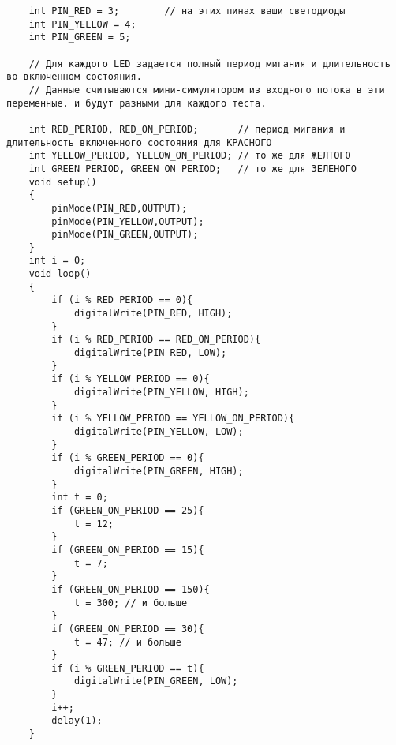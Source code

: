\codeExample

\begin{verbatim}
    int PIN_RED = 3;        // на этих пинах ваши светодиоды
    int PIN_YELLOW = 4;
    int PIN_GREEN = 5;

    // Для каждого LED задается полный период мигания и длительность во включенном состояния.
    // Данные считываются мини-симулятором из входного потока в эти переменные. и будут разными для каждого теста.

    int RED_PERIOD, RED_ON_PERIOD;       // период мигания и длительность включенного состояния для КРАСНОГО
    int YELLOW_PERIOD, YELLOW_ON_PERIOD; // то же для ЖЕЛТОГО
    int GREEN_PERIOD, GREEN_ON_PERIOD;   // то же для ЗЕЛЕНОГО 
    void setup()
    {
        pinMode(PIN_RED,OUTPUT);
        pinMode(PIN_YELLOW,OUTPUT);
        pinMode(PIN_GREEN,OUTPUT);
    }
    int i = 0;
    void loop()
    {
        if (i % RED_PERIOD == 0){
            digitalWrite(PIN_RED, HIGH);
        }
        if (i % RED_PERIOD == RED_ON_PERIOD){
            digitalWrite(PIN_RED, LOW);   
        }
        if (i % YELLOW_PERIOD == 0){
            digitalWrite(PIN_YELLOW, HIGH);
        }
        if (i % YELLOW_PERIOD == YELLOW_ON_PERIOD){
            digitalWrite(PIN_YELLOW, LOW);   
        }
        if (i % GREEN_PERIOD == 0){
            digitalWrite(PIN_GREEN, HIGH);
        }
        int t = 0;
        if (GREEN_ON_PERIOD == 25){
            t = 12;
        }
        if (GREEN_ON_PERIOD == 15){
            t = 7;
        }
        if (GREEN_ON_PERIOD == 150){
            t = 300; // и больше
        }
        if (GREEN_ON_PERIOD == 30){
            t = 47; // и больше
        }
        if (i % GREEN_PERIOD == t){
            digitalWrite(PIN_GREEN, LOW);   
        }
        i++;
        delay(1);
    }
\end{verbatim}